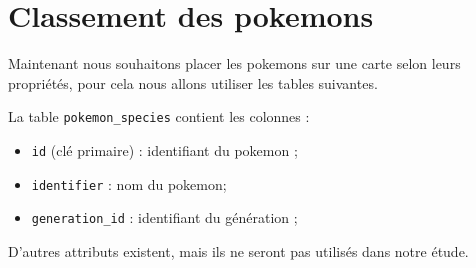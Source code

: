 \section*{Classement des pokemons}
Maintenant nous souhaitons placer les pokemons sur une carte selon leurs propriétés, pour cela nous allons utiliser les tables suivantes.


La table \texttt{pokemon\_species} contient les colonnes :

\begin{itemize}[itemsep=0mm]
	\item \texttt{id} (clé primaire) : identifiant du pokemon ;
	\item \texttt{identifier} : nom du pokemon;
	\item \texttt{generation\_id} : identifiant du génération ;
\end{itemize}
D'autres attributs existent, mais ils ne seront pas utilisés dans notre étude. 


